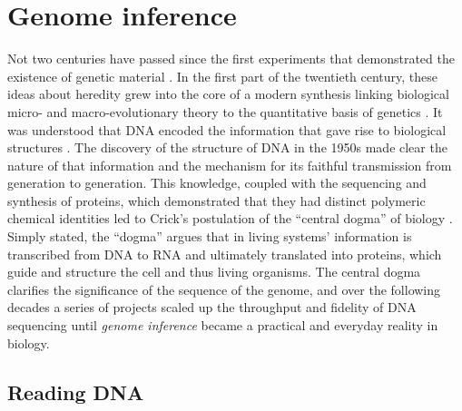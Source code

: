 \documentclass[a4paper,12pt,numbered,oneside]{Classes/PhDThesisPSnPDF}
\providecommand{\DIFaddbegin}{} %
\providecommand{\DIFaddend}{} %
\begin{document}
\section{Genome inference}
\DIFaddbegin \label{sec:genome_inference}
\DIFaddend 

Not two centuries have passed since the first experiments that demonstrated the existence of genetic material \cite{mendel1866versuche}.
In the first part of the twentieth century, these ideas about heredity grew into the core of a modern synthesis linking biological micro- and macro-evolutionary theory to the quantitative basis of genetics \cite{huxley1942evolution}.
It was understood that DNA encoded the information that gave rise to biological structures \cite{avery1944studies}.
The discovery of the structure of DNA in the 1950s \cite{watson1953molecular} made clear the nature of that information and the mechanism for its faithful transmission from generation to generation.
This knowledge, coupled with the sequencing and synthesis of proteins, which demonstrated that they had distinct polymeric chemical identities \cite{sanger1951amino} led to Crick's postulation of the ``central dogma'' of biology \cite{crick1958protein,crick1970central}.
Simply stated, the ``dogma'' argues that in living systems' information is transcribed from DNA to RNA and ultimately translated into proteins, which guide and structure the cell and thus living organisms.
The central dogma clarifies the significance of the sequence of the genome, and over the following decades a series of projects scaled up the throughput and fidelity of DNA sequencing until \emph{genome inference} became a practical and everyday reality in biology.

\subsection{Reading DNA}
\end{document}
